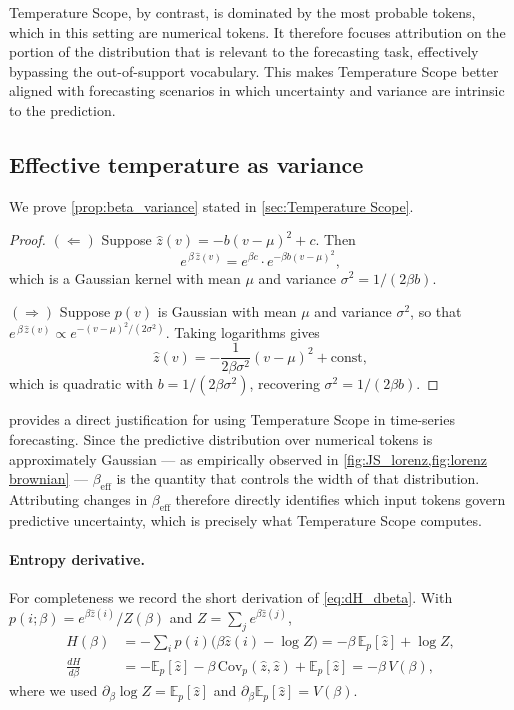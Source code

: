 \documentclass{article}
\begin{document}
Temperature Scope, by contrast, is dominated by the most probable tokens, which in this setting are numerical tokens.
It therefore focuses attribution on the portion of the distribution that is relevant to the forecasting task, effectively bypassing the out-of-support vocabulary.
This makes Temperature Scope better aligned with forecasting scenarios in which uncertainty and variance are intrinsic to the prediction.

\subsection{Effective temperature as variance}
\label{app:beta_variance}

We prove \cref{prop:beta_variance} stated in \cref{sec:Temperature Scope}.

\begin{proof}
$(\Leftarrow)$
Suppose $\hat{z}(v) = -b(v-\mu)^2 + c$.
Then
\[
    e^{\,\beta\,\hat{z}(v)} = e^{\beta c}\cdot e^{-\beta b(v-\mu)^2},
\]
which is a Gaussian kernel with mean $\mu$ and variance $\sigma^2 = 1/(2\beta b)$.

$(\Rightarrow)$
Suppose $p(v)$ is Gaussian with mean $\mu$ and variance $\sigma^2$, so that $e^{\,\beta\,\hat{z}(v)} \propto e^{-(v-\mu)^2/(2\sigma^2)}$.
Taking logarithms gives
\[
    \hat{z}(v) = -\frac{1}{2\beta\sigma^2}(v-\mu)^2 + \mathrm{const},
\]
which is quadratic with $b = 1/(2\beta\sigma^2)$, recovering $\sigma^2 = 1/(2\beta b)$.
\end{proof}

\noindent
{} provides a direct justification for using Temperature Scope in time-series forecasting.
Since the predictive distribution over numerical tokens is approximately Gaussian --- as empirically observed in \cref{fig:JS_lorenz,fig:lorenz brownian} --- $\beta_\mathrm{eff}$ is the quantity that controls the width of that distribution.
Attributing changes in $\beta_\mathrm{eff}$ therefore directly identifies which input tokens govern predictive uncertainty, which is precisely what Temperature Scope computes.

\paragraph{Entropy derivative.}
For completeness we record the short derivation of \cref{eq:dH_dbeta}.
With $p(i;\beta)=e^{\beta\hat{z}(i)}/Z(\beta)$ and $Z=\sum_j e^{\beta\hat{z}(j)}$,
\begin{align*}
H(\beta)
&= -\sum_i p(i)\bigl(\beta\hat{z}(i)-\log Z\bigr)
= -\beta\,\mathbb{E}_p[\hat{z}]+\log Z,\\
\frac{dH}{d\beta}
&= -\mathbb{E}_p[\hat{z}]-\beta\,\mathrm{Cov}_p(\hat{z},\hat{z})+\mathbb{E}_p[\hat{z}]
= -\beta\, V(\beta),
\end{align*}
where we used $\partial_\beta\log Z=\mathbb{E}_p[\hat{z}]$ and $\partial_\beta\mathbb{E}_p[\hat{z}]=V(\beta)$.
\end{document}

